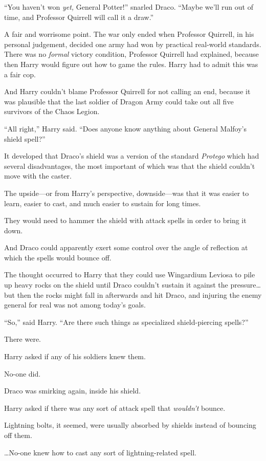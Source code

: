 “You haven’t won \emph{yet,} General Potter!” snarled Draco. “Maybe we’ll run out of time, and Professor Quirrell will call it a draw.”

A fair and worrisome point. The war only ended when Professor Quirrell, in his personal judgement, decided one army had won by practical real-world standards. There was no \emph{formal} victory condition, Professor Quirrell had explained, because then Harry would figure out how to game the rules. Harry had to admit this was a fair cop.

And Harry couldn’t blame Professor Quirrell for not calling an end, because it was plausible that the last soldier of Dragon Army could take out all five survivors of the Chaos Legion.

“All right,” Harry said. “Does anyone know anything about General Malfoy’s shield spell?”

It developed that Draco’s shield was a version of the standard \emph{Protego} which had several disadvantages, the most important of which was that the shield couldn’t move with the caster.

The upside—or from Harry’s perspective, downside—was that it was easier to learn, easier to cast, and much easier to sustain for long times.

They would need to hammer the shield with attack spells in order to bring it down.

And Draco could apparently exert some control over the angle of reflection at which the spells would bounce off.

The thought occurred to Harry that they could use Wingardium Leviosa to pile up heavy rocks on the shield until Draco couldn’t sustain it against the pressure…but then the rocks might fall in afterwards and hit Draco, and injuring the enemy general for real was not among today’s goals.

“So,” said Harry. “Are there such things as specialized shield-piercing spells?”

There were.

Harry asked if any of his soldiers knew them.

No-one did.

Draco was smirking again, inside his shield.

Harry asked if there was any sort of attack spell that \emph{wouldn’t} bounce.

Lightning bolts, it seemed, were usually absorbed by shields instead of bouncing off them.

…No-one knew how to cast any sort of lightning-related spell.

